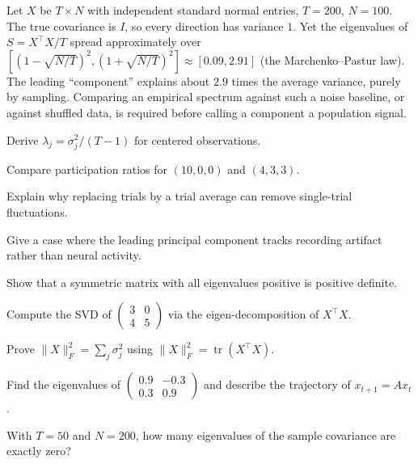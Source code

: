 \begin{workedexample}
Let $X$ be $T\times N$ with independent standard normal entries, $T=200$, $N=100$. The true covariance is $I$, so every direction has variance $1$. Yet the eigenvalues of $S=X^\top X/T$ spread approximately over $[(1-\sqrt{N/T})^2,(1+\sqrt{N/T})^2]\approx[0.09,2.91]$ (the Marchenko--Pastur law). The leading ``component'' explains about $2.9$ times the average variance, purely by sampling. Comparing an empirical spectrum against such a noise baseline, or against shuffled data, is required before calling a component a population signal.
\end{workedexample}
\begin{exercises}
\item Derive $\lambda_j=\sigma_j^2/(T-1)$ for centered observations.
\item Compare participation ratios for $(10,0,0)$ and $(4,3,3)$.
\item Explain why replacing trials by a trial average can remove single-trial fluctuations.
\item Give a case where the leading principal component tracks recording artifact rather than neural activity.
\item Show that a symmetric matrix with all eigenvalues positive is positive definite.
\item Compute the SVD of $\begin{pmatrix}3&0\\4&5\end{pmatrix}$ via the eigen-decomposition of $X^\top X$.
\item Prove $\|X\|_F^2=\sum_j\sigma_j^2$ using $\|X\|_F^2=\operatorname{tr}(X^\top X)$.
\item Find the eigenvalues of $\begin{pmatrix}0.9&-0.3\\0.3&0.9\end{pmatrix}$ and describe the trajectory of $x_{t+1}=Ax_t$.
\item With $T=50$ and $N=200$, how many eigenvalues of the sample covariance are exactly zero?
\end{exercises}
